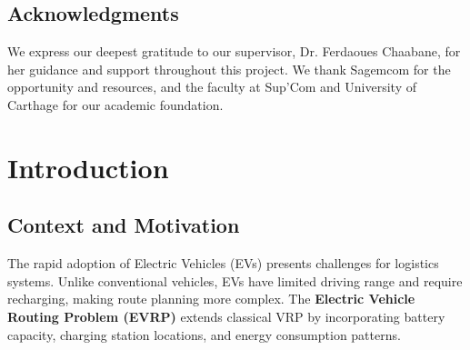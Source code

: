 \documentclass[11pt,a4paper]{article}
\begin{document}
\begin{center}
\section*{Acknowledgments}
\end{center}

\vspace{1cm}

\begin{large}
\begin{onehalfspacing}
We express our deepest gratitude to our supervisor, Dr. Ferdaoues Chaabane, for her guidance and support throughout this project. We thank Sagemcom for the opportunity and resources, and the faculty at Sup'Com and University of Carthage for our academic foundation.
\end{onehalfspacing}
\end{large}

\vfill
\restoregeometry

\cleardoublepage
{}
\fancyhf{}
\rhead{\thepage}
\tableofcontents

\cleardoublepage
{}
\setcounter{page}{1}
\fancyhf{}
\rhead{\thepage}
\onehalfspacing

\section{Introduction}

\subsection{Context and Motivation}

The rapid adoption of Electric Vehicles (EVs) presents challenges for logistics systems. Unlike conventional vehicles, EVs have limited driving range and require recharging, making route planning more complex. The \textbf{Electric Vehicle Routing Problem (EVRP)} extends classical VRP by incorporating battery capacity, charging station locations, and energy consumption patterns.
\end{document}
